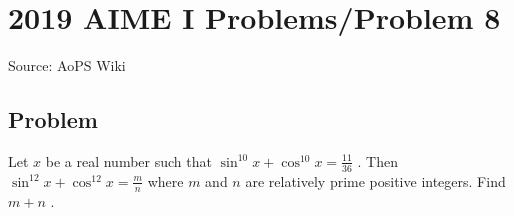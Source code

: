 \documentclass[12pt]{article}
\begin{document}
\section*{{2019 AIME I Problems/Problem 8}}
Source: AoPS Wiki

\subsection*{Problem}
Let $x$ be a real number such that $\sin^{10}x+\cos^{10} x = \tfrac{11}{36}$ . Then $\sin^{12}x+\cos^{12} x = \tfrac{m}{n}$ where $m$ and $n$ are relatively prime positive integers. Find $m+n$ .
\end{document}
